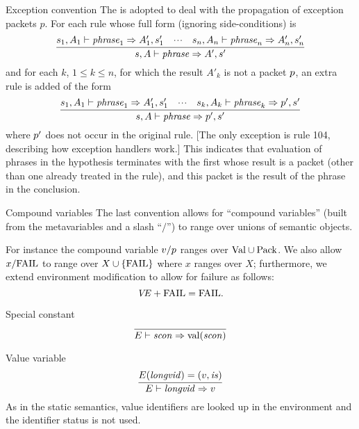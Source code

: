 \begin{convention}{Exception convention}
The  is adopted to deal with the
propagation of exception packets $p$. For each rule whose full form
(ignoring side-conditions) is
\begin{equation*}
\infer{ \s,A\ts\phrase\ra A',\s'}
      { \s_{1},A_{1}\ts\phrase_{1}\ra A'_{1},\s'_{1}
        & \cdots
        & \s_{n},A_{n}\ts\phrase_{n}\ra A'_{n},\s'_{n} }
\end{equation*}
and for each $k$, $1\leq k\leq n$, for which the result $A'_{k}$ is not a
packet $p$, an extra rule is added of the form
\begin{equation*}
\infer{ \s,A\ts\phrase\ra \p',\s'}
      { \s_{1},A_{1}\ts\phrase_{1}\ra A'_{1},\s'_{1}
        & \cdots
        & \s_{k},A_{k}\ts\phrase_{k}\ra \p',\s' }
\end{equation*}
where $p'$ does not occur in the original rule. [The only exception is
  rule 104, describing how exception handlers work.]
This indicates that evaluation of phrases in the hypothesis terminates with the
first whose result is a packet (other than one already treated in the rule),
and this packet is the result of the phrase in the conclusion.
\end{convention}

\begin{convention}{Compound variables}
The last convention allows for ``compound variables'' (built from the
metavariables and a slash ``$/$'') to range over unions of semantic
objects.

For instance 
the compound variable $v/p$ ranges
over ${\rm Val}\cup{\rm Pack}$. 
We also allow $x/{\rm FAIL}$ to range over $X\cup\{{\rm FAIL}\}$ where $x$ 
ranges over $X$;
furthermore, we extend environment modification to allow for failure
as follows:
\begin{equation*}
\textit{V\kern-.05emE\/}+{\rm FAIL}={\rm FAIL}.
\end{equation*}
\end{convention}


\begin{inference-rule}{Special constant}
\begin{equation}\label{rule:dynamic-core:sconexp}
\vcenter{\infer{\E\ts\scon\ra\sconval(\scon)}
  {}}
\end{equation}
\end{inference-rule}

\begin{inference-rule}{Value variable}
\begin{equation}\label{rule:dynamic-core:varexp}
\vcenter{\infer{\E\ts\longvid\ra\V}
  {\E(\longvid)=(\V,\is)}}
\end{equation}
As in the static semantics, value identifiers are looked up in the
environment and the identifier status is not used.
\end{inference-rule}

